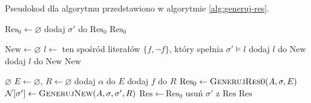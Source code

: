 \documentclass[11pt,a4paper]{article}
\theoremstyle{definition}
\begin{document}
Pseudokod dla algorytmu przedstawiono w algorytmie \ref{alg:generuj-res}.

\begin{algorithm}[H]
\caption{Pseudokod dla algorytmu wyznaczający funkcję $\mathrm{Res}$}
\label{alg:generuj-res}
\begin{algorithmic}[1]
        \State $\mathrm{Res}_0 \gets \varnothing$
                \State dodaj $\sigma'$ do $\mathrm{Res}_0$
            \EndIf
        \EndFor
        \State \Return $\mathrm{Res}_0$
    \EndProcedure

        \State $\mathrm{New} \gets \varnothing$
            \State $l \gets$ ten spośród literałów $\{f, \neg f\}$, który spełnia $\sigma' \models l$
                \State dodaj $l$ do $\mathrm{New}$
                \State dodaj $l$ do $\mathrm{New}$
            \EndIf
        \EndFor
        \State \Return $\mathrm{New}$
    \EndProcedure

            \If{$\sigma \models \pi$}
                \State \Return $\varnothing$
            \EndIf
        \EndFor
        \State $E \gets \varnothing$, $R \gets \varnothing$
            \If{$\sigma \models \pi$}
                \State dodaj $\alpha$ do $E$
            \EndIf
        \EndFor
            \If{$\sigma \models \pi$}
                \State dodaj $f$ do $R$
            \EndIf
        \EndFor
        \State $\mathrm{Res}_0 \gets \Call{GenerujRes0}{A, \sigma, E}$
            \State $\mathcal{N}[\sigma'] \gets \Call{GenerujNew}{A, \sigma, \sigma', R}$
        \EndFor
        \State $\mathrm{Res} \gets \mathrm{Res}_0$
                \State usuń $\sigma'$ z $\mathrm{Res}$
            \EndIf
        \EndFor
        \State \Return $\mathrm{Res}$
    \EndProcedure
\end{algorithmic}
\end{algorithm}
\end{document}
